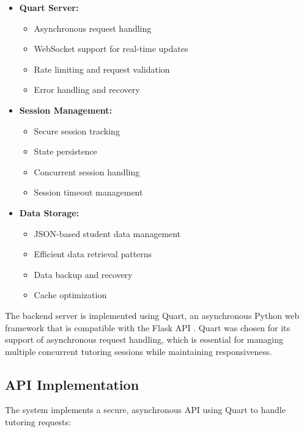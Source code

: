 \begin{itemize}
  \item \textbf{Quart Server:} 
    \begin{itemize}
      \item Asynchronous request handling
      \item WebSocket support for real-time updates
      \item Rate limiting and request validation
      \item Error handling and recovery
    \end{itemize}
  
  \item \textbf{Session Management:} 
    \begin{itemize}
      \item Secure session tracking
      \item State persistence
      \item Concurrent session handling
      \item Session timeout management
    \end{itemize}
  
  \item \textbf{Data Storage:} 
    \begin{itemize}
      \item JSON-based student data management
      \item Efficient data retrieval patterns
      \item Data backup and recovery
      \item Cache optimization
    \end{itemize}
\end{itemize}

The backend server is implemented using Quart, an asynchronous Python web framework that is compatible with the Flask API \cite{pallets2024quart}. Quart was chosen for its support of asynchronous request handling, which is essential for managing multiple concurrent tutoring sessions while maintaining responsiveness.

\subsection{API Implementation}
\label{subsec:api-implementation}

The system implements a secure, asynchronous API using Quart to handle tutoring requests:

